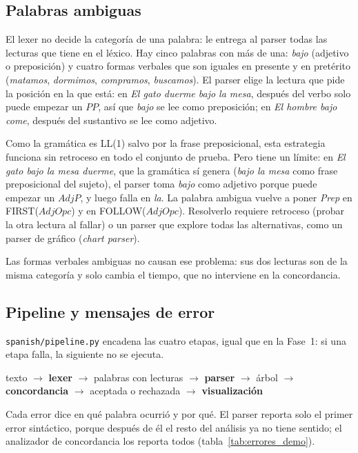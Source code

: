 \subsection{Palabras ambiguas}

El lexer no decide la categoría de una palabra: le entrega al parser todas las lecturas que
tiene en el léxico. Hay cinco palabras con más de una: \emph{bajo} (adjetivo o preposición) y
cuatro formas verbales que son iguales en presente y en pretérito (\emph{matamos},
\emph{dormimos}, \emph{compramos}, \emph{buscamos}). El parser elige la lectura que pide la
posición en la que está: en \emph{El gato duerme bajo la mesa}, después del verbo solo puede
empezar un $PP$, así que \emph{bajo} se lee como preposición; en \emph{El hombre bajo come},
después del sustantivo se lee como adjetivo.

Como la gramática es LL(1) salvo por la frase preposicional, esta estrategia funciona sin
retroceso en todo el conjunto de prueba. Pero tiene un límite: en \emph{El gato bajo la mesa
duerme}, que la gramática sí genera (\emph{bajo la mesa} como frase preposicional del sujeto), el
parser toma \emph{bajo} como adjetivo porque puede empezar un $AdjP$, y luego falla en
\emph{la}. La palabra ambigua vuelve a poner \textit{Prep} en FIRST($AdjOpc$) y en
FOLLOW($AdjOpc$). Resolverlo requiere retroceso (probar la otra lectura al fallar) o un parser
que explore todas las alternativas, como un parser de gráfico (\emph{chart parser}).

Las formas verbales ambiguas no causan ese problema: sus dos lecturas son de la misma categoría
y solo cambia el tiempo, que no interviene en la concordancia.

\subsection{Pipeline y mensajes de error}

\texttt{spanish/pipeline.py} encadena las cuatro etapas, igual que en la Fase~1: si una etapa
falla, la siguiente no se ejecuta.
\begin{center}
  texto $\to$ \textbf{lexer} $\to$ palabras con lecturas $\to$ \textbf{parser} $\to$ árbol
  $\to$ \textbf{concordancia} $\to$ aceptada o rechazada $\to$ \textbf{visualización}
\end{center}
Cada error dice en qué palabra ocurrió y por qué. El parser reporta solo el primer error
sintáctico, porque después de él el resto del análisis ya no tiene sentido; el analizador de
concordancia los reporta todos (tabla~\ref{tab:errores_demo}).

